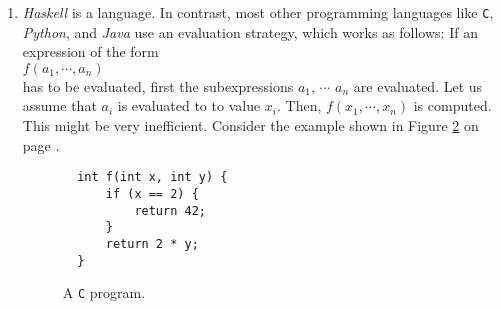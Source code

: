 \begin{enumerate}
    Admittedly, the \texttt{C} implementation runs in 0.33 seconds and is about twice as fast as
    \textsl{Haskell}.  A \textsl{Java} implementation is as fast as the \texttt{C} implementation.
\begin{figure}[!ht]
\centering
\begin{verbatim}
    fib :: Int -> Int
    fib 0 = 0
    fib 1 = 1
    fib n = fib (n - 1) + fib (n - 2)
    
    main :: IO ()
    main = do
        let n = 40  -- Calculate the 40th Fibonacci number
        print (fib n)
\end{verbatim}
\vspace*{-0.3cm}
\caption{Computing the Fibonnacci numbers in Haskell}
\label{fig:fibonacci.hs}
\end{figure}

  
\item \textsl{Haskell} is a  language.  In contrast, most other programming languages like
  \texttt{C}, \textsl{Python}, and \textsl{Java} use an  evaluation strategy, which works as follows:
  If an expression  of the form
  \\[0.2cm]
  \hspace*{1.3cm}
  $f(a_1, \cdots, a_n)$
  \\[0.2cm]
  has to be evaluated, first the subexpressions $a_1$, $\cdots$ $a_n$ are evaluated.  Let us assume that $a_i$
  is evaluated to to value $x_i$.  Then, $f(x_1, \cdots, x_n)$ is computed.  This might be very inefficient.
  Consider the example shown in Figure \ref{fig:eager.c} on page \pageref{fig:eager.c}.

\begin{figure}[!ht]
  \centering
\begin{verbatim}
  int f(int x, int y) {
      if (x == 2) {
          return 42;
      }
      return 2 * y;
  }
\end{verbatim}
\vspace*{-0.3cm}
\caption{A \texttt{C} program.}
\label{fig:eager.c}
\end{figure}


\end{enumerate}
